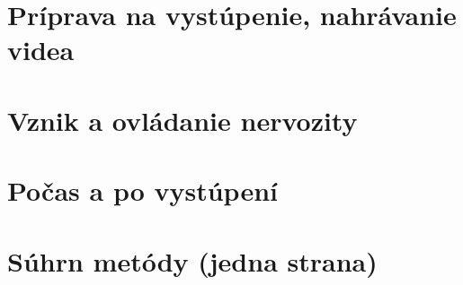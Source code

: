 \documentclass[11pt,a4paper]{book}
\begin{document}
\section{Príprava na vystúpenie, nahrávanie videa}\label{s:performance-preparation}

\section{Vznik a ovládanie nervozity}\label{s:origin-nervousness}

\section{Počas a po vystúpení}\label{s:during-performance}

\newpage
\section{Súhrn metódy (jedna strana)}\label{s:summary-method}
\end{document}
